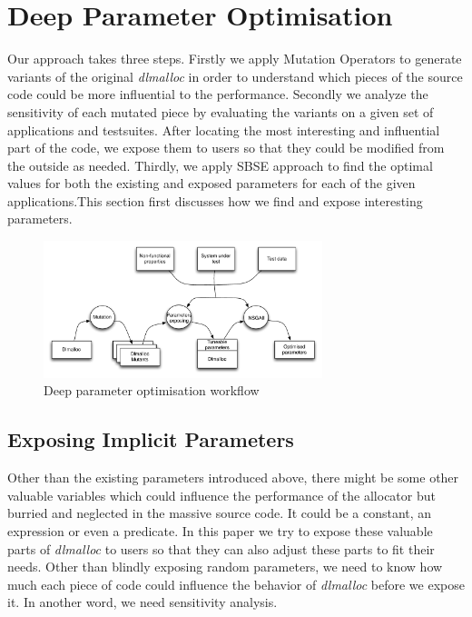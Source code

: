 \section{Deep Parameter Optimisation}

Our approach takes three steps. Firstly we apply Mutation Operators to generate variants of the original \emph{dlmalloc} in order to understand which pieces of the source code could be more influential to the performance. Secondly we analyze the sensitivity of each mutated piece by evaluating the variants on a given set of applications and testsuites. After locating the most interesting and influential part of the code, we expose them to users so that they could be modified from the outside as needed. Thirdly, we apply SBSE approach to find the optimal values for both the existing and exposed parameters for each of the given applications.This section first discusses how we find and expose interesting parameters.


\begin{figure}[htbp]
\centering
\includegraphics[width=3.2in]{pics/system}
\caption{Deep parameter optimisation workflow}\label{system}
\end{figure}


\subsection{Exposing Implicit Parameters}
Other than the existing parameters introduced above, there might be some other valuable variables which could influence the performance of the allocator but burried and neglected in the massive source code. It could be a constant, an expression or even a predicate. In this paper we try to expose these valuable parts of \emph{dlmalloc} to users so that they can also adjust these parts to fit their needs. Other than blindly exposing random parameters, we need to know how much each piece of code could influence the behavior of \emph{dlmalloc} before we expose it. In another word, we need sensitivity analysis.

